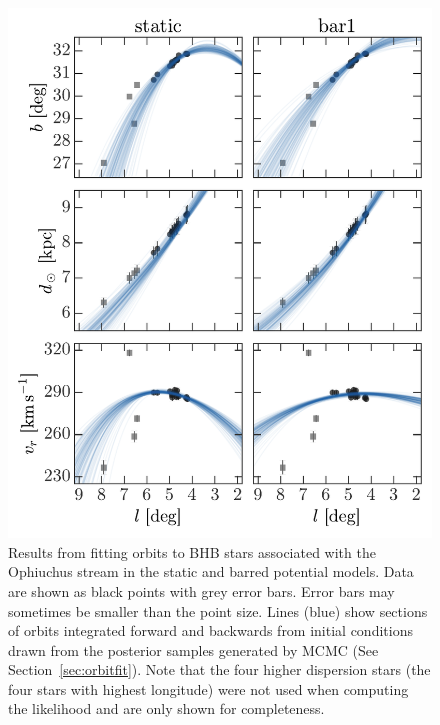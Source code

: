 \documentclass[letterpaper,12pt,preprint]{aastex}
\begin{document}
\clearpage
\begin{figure}[p]
\begin{center}
\includegraphics[width=\textwidth]{figures/orbitfits}
\caption{ Results from fitting orbits to BHB stars associated with the Ophiuchus stream in the static and barred potential models. Data are shown as black points with grey error bars. Error bars may sometimes be smaller than the point size. Lines (blue) show sections of orbits integrated forward and backwards from initial conditions drawn from the posterior samples generated by MCMC (See Section~\ref{sec:orbitfit}). Note that the four higher dispersion stars (the four stars with highest longitude) were not used when computing the likelihood and are only shown for completeness. }
\label{fig:orbitfits}
\end{center}
\end{figure}
\end{document}
